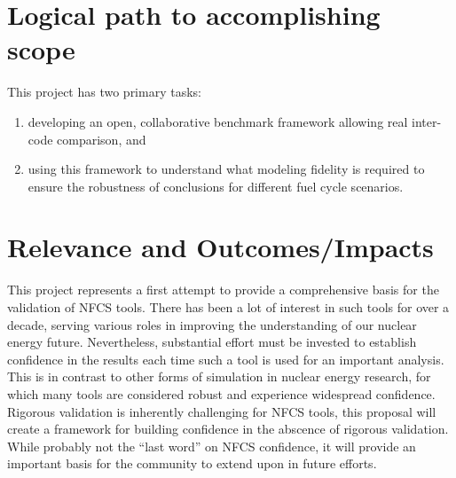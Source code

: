 \section{Logical path to accomplishing scope}

This project has two primary tasks:
\begin{enumerate}
\item developing an open, collaborative benchmark framework allowing real
  inter-code comparison, and
\item using this framework to understand what modeling fidelity is required to
  ensure the robustness of conclusions for different fuel cycle scenarios.
\end{enumerate}






\section{Relevance and Outcomes/Impacts}

This project represents a first attempt to provide a comprehensive basis for
the validation of \gls{NFCS} tools.  There has been a lot of interest in such
tools for over a decade, serving various roles in improving the understanding
of our nuclear energy future.  Nevertheless, substantial effort must be
invested to establish confidence in the results each time such a tool is used
for an important analysis.  This is in contrast to other forms of simulation
in nuclear energy research, for which many tools are considered robust and
experience widespread confidence.  Rigorous validation is inherently
challenging for \gls{NFCS} tools, this proposal will create a framework for
building confidence in the abscence of rigorous validation.  While probably
not the ``last word'' on \gls{NFCS} confidence, it will provide an important
basis for the community to extend upon in future efforts.

